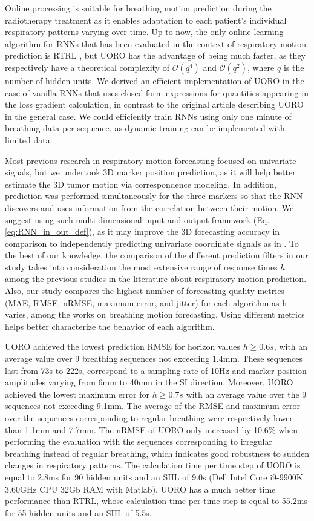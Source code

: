 \documentclass[twocolumn,a4paper]{svjour3} \sloppy          \smartqed
\begin{document}
Online processing is suitable for breathing motion prediction during the radiotherapy treatment as it enables adaptation to each patient's individual respiratory patterns varying over time. Up to now, the only online learning algorithm for RNNs that has been evaluated in the context of respiratory motion prediction is RTRL \cite{mafi2020real, POHL2021101941}, but UORO has the advantage of being much faster, as they respectively have a theoretical complexity of $\mathcal{O}(q^4)$ and $\mathcal{O}(q^2)$, where $q$ is the number of hidden units. We derived an efficient implementation of UORO in the case of vanilla RNNs that uses closed-form expressions for quantities appearing in the loss gradient calculation, in contrast to the original article \citep{tallec2017unbiased} describing UORO in the general case. We could efficiently train RNNs using only one minute of breathing data per sequence, as dynamic training can be implemented with limited data. 

Most previous research in respiratory motion forecasting focused on univariate signals, but we undertook 3D marker position prediction, as it will help better estimate the 3D tumor motion via correspondence modeling. In addition, prediction was performed simultaneously for the three markers so that the RNN discovers and uses information from the correlation between their motion. We suggest using such multi-dimensional input and output framework (Eq. \ref{eq:RNN_in_out_def}), as it may improve the 3D forecasting accuracy in comparison to independently predicting univariate coordinate signals as in \cite{kai2018prediction, jiang2019prediction}. To the best of our knowledge, the comparison of the different prediction filters in our study takes into consideration the most extensive range of response times $h$ among the previous studies in the literature about respiratory motion prediction. Also, our study compares the highest number of forecasting quality metrics (MAE, RMSE, nRMSE, maximum error, and jitter) for each algorithm as h varies, among the works on breathing motion forecasting. Using different metrics helps better characterize the behavior of each algorithm.

UORO achieved the lowest prediction RMSE for horizon values $h \geq 0.6s$, with an average value over 9 breathing sequences not exceeding 1.4mm. These sequences last from 73s to 222s, correspond to a sampling rate of 10Hz and marker position amplitudes varying from 6mm to 40mm in the SI direction. Moreover, UORO achieved the lowest maximum error for $h \geq 0.7s$ with an average value over the 9 sequences not exceeding 9.1mm. The average of the RMSE and maximum error over the sequences corresponding to regular breathing were respectively lower than 1.1mm and 7.7mm. The nRMSE of UORO only increased by 10.6\% when performing the evaluation with the sequences corresponding to irregular breathing instead of regular breathing, which indicates good robustness to sudden changes in respiratory patterns. The calculation time per time step of UORO is equal to 2.8ms for 90 hidden units and an SHL of 9.0s (Dell Intel Core i9-9900K 3.60GHz CPU 32Gb RAM with Matlab). UORO has a much better time performance than RTRL, whose calculation time per time step is equal to 55.2ms for 55 hidden units and an SHL of 5.5s.
\end{document}
